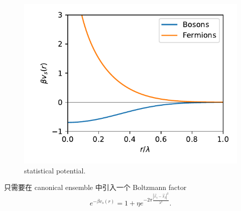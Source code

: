 \begin{itemize}
	\begin{figure}[H]
		\centering
		\includegraphics[scale=0.8]{figures/statistical potential.pdf}
		\caption{statistical potential.}
	\end{figure}
	
	\begin{tcolorbox}[title=proof:]
		只需要在 canonical ensemble 中引入一个 Boltzmann factor
		\begin{equation}
			e^{- \beta v_s(r)} = 1 + \eta e^{- 2 \pi \frac{|\vec{x}_1 - \vec{x}_2|^2}{\lambda^2}}.
		\end{equation}
	\end{tcolorbox}
\end{itemize}

